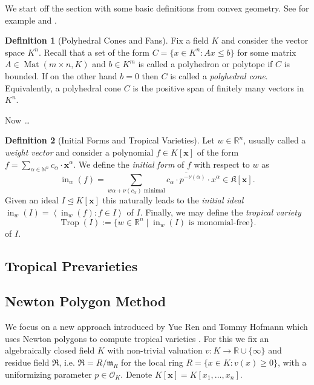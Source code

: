 \documentclass[
  paper=a4,
  DIV=14,
  fontsize=12pt,
  titlepage,
  bibliography=totoc,
  pagesize=pdftex
]{scrartcl}
\numberwithin{figure}{section}
\numberwithin{equation}{section}
\numberwithin{table}{section}
\newcommand*\setR{\mathds{R}}
\newcommand*\setN{\mathds{N}}
\newcommand*\ideal[1]{\left\langle #1 \right\rangle}
\let\vec\mathbf
\let\idealof\trianglelefteq
\DeclareMathOperator{\Mat}{Mat}
\DeclareMathOperator{\Trop}{Trop}
\DeclareMathOperator{\initial}{in}
\theoremstyle{definition}
\newtheorem{definition}{Definition}
\numberwithin{definition}{section}
\begin{document}
We start off the section with some basic definitions from convex geometry. See for example
\cite{compGrobFan} and \cite{SturmGBCP}.

\begin{definition}[Polyhedral Cones and Fans]
  Fix a field $K$ and consider the vector space $K^n$. Recall that a set of the form $C =
  \{ x \in K^n : Ax \leq b \}$ for some matrix $A \in \Mat(m\times n, K)$ and $b \in K^m$
  is called a polyhedron or polytope if $C$ is bounded. If on the other hand $b=0$ then
  $C$ is called a \emph{polyhedral cone}. Equivalently, a polyhedral cone $C$ is the
  positive span of finitely many vectors in $K^n$.
  \label{def:polyhedralFan}
\end{definition}
Now \ldots

\begin{definition}[Initial Forms and Tropical Varieties]
  Let $w \in \setR^n$, usually called a \emph{weight vector} and consider a polynomial $f
  \in K[\vec x]$ of the form $f = \sum_{\alpha \in \setN^n} c_\alpha \cdot \vec x^\alpha$.
  We define the \emph{initial form} of $f$ with respect to $w$ as
  \[
    \initial_w(f) = \sum_{w\alpha + \nu(c_\alpha) \text{ minimal}}
    \overline{c_\alpha \cdot p^{-\nu(\alpha)}} \cdot x^\alpha
    \in \mathfrak K[\vec x].
  \]
  Given an ideal $I \idealof K[\vec x]$ this naturally leads to the \emph{initial ideal}
  $\initial_w(I) = \ideal{\initial_w(f) : f\in I}$ of $I$. Finally, we may define the
  \emph{tropical variety}
  \[
    \Trop(I) := \{ w\in \setR^n \mid \initial_w(I) \text{ is monomial-free} \}.
  \]
  of $I$.
  \label{def:tropicalVariety}
\end{definition}

\subsection{Tropical Prevarieties}

\subsection{Newton Polygon Method}

We focus on a new approach introduced by Yue Ren and Tommy Hofmann which uses Newton
polygons to compute tropical varieties \cite{tropPointsLinks}. For this we fix an
algebraically closed field $K$ with non-trivial valuation $v:K\to\setR \cup \{\infty\}$
and residue field $\mathfrak R$, i.e. $\mathfrak R = R/\mathfrak m_R$ for the local ring
$R = \{ x \in K : v(x) \geq 0 \}$, with a uniformizing parameter $p\in \mathcal O_K$.
Denote $K[\vec x] = K[x_1, \ldots, x_n]$.
\end{document}
